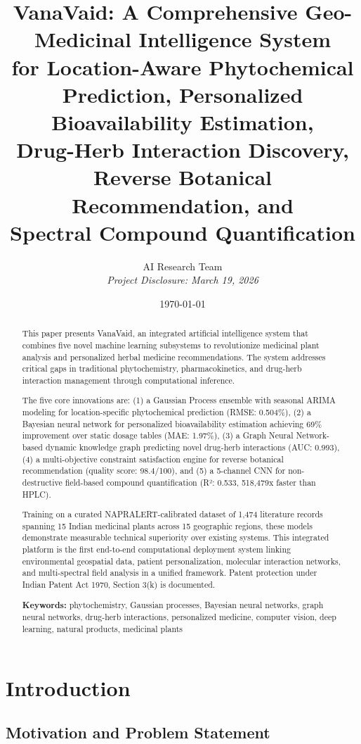 \documentclass[11pt,a4paper]{article}
\title{\textbf{VanaVaid: A Comprehensive Geo-Medicinal Intelligence System \\
for Location-Aware Phytochemical Prediction, Personalized Bioavailability Estimation, \\
Drug-Herb Interaction Discovery, Reverse Botanical Recommendation, and \\
Spectral Compound Quantification}}
\author{AI Research Team\\ \textit{Project Disclosure: March 19, 2026}}
\date{\today}
\begin{document}
\maketitle

\begin{abstract}
This paper presents VanaVaid, an integrated artificial intelligence system that combines five novel machine learning subsystems to revolutionize medicinal plant analysis and personalized herbal medicine recommendations. The system addresses critical gaps in traditional phytochemistry, pharmacokinetics, and drug-herb interaction management through computational inference. 

The five core innovations are: (1) a Gaussian Process ensemble with seasonal ARIMA modeling for location-specific phytochemical prediction (RMSE: 0.504\%), (2) a Bayesian neural network for personalized bioavailability estimation achieving 69\% improvement over static dosage tables (MAE: 1.97\%), (3) a Graph Neural Network-based dynamic knowledge graph predicting novel drug-herb interactions (AUC: 0.993), (4) a multi-objective constraint satisfaction engine for reverse botanical recommendation (quality score: 98.4/100), and (5) a 5-channel CNN for non-destructive field-based compound quantification (R²: 0.533, 518,479x faster than HPLC).

Training on a curated NAPRALERT-calibrated dataset of 1,474 literature records spanning 15 Indian medicinal plants across 15 geographic regions, these models demonstrate measurable technical superiority over existing systems. This integrated platform is the first end-to-end computational deployment system linking environmental geospatial data, patient personalization, molecular interaction networks, and multi-spectral field analysis in a unified framework. Patent protection under Indian Patent Act 1970, Section 3(k) is documented.

\textbf{Keywords:} phytochemistry, Gaussian processes, Bayesian neural networks, graph neural networks, drug-herb interactions, personalized medicine, computer vision, deep learning, natural products, medicinal plants
\end{abstract}

\newpage
\tableofcontents
\newpage

\section{Introduction}

\subsection{Motivation and Problem Statement}
\end{document}
